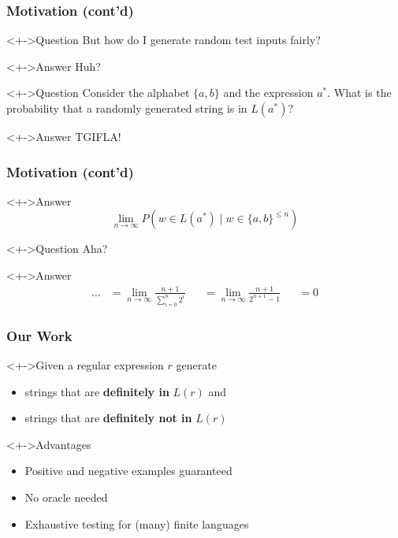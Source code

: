 \documentclass[pdftex]{beamer}
\begin{document}
\begin{frame}
  \frametitle{Motivation (cont'd)}
  \begin{block}<+->{Question}
    But how do I generate random test inputs fairly?
  \end{block}
  \begin{exampleblock}<+->{Answer}
    Huh?
  \end{exampleblock}
  \begin{block}<+->{Question}
    Consider the alphabet $\{a,b\}$ and the expression $a^*$. What is
    the probability that a randomly generated string is in $L (a^*)$?
  \end{block}
  \begin{exampleblock}<+->{Answer}
    TGIFLA!
  \end{exampleblock}
\end{frame}
\begin{frame}
  \frametitle{Motivation (cont'd)}
  \begin{exampleblock}<+->{Answer}
    \begin{displaymath}
      \lim_{n\to\infty} P (w \in L(a^*) \mid w \in \{a,b\}^{\le n})
    \end{displaymath}
  \end{exampleblock}
  \begin{block}<+->{Question}
    Aha?
  \end{block}
  \begin{exampleblock}<+->{Answer}
    \vspace{-\baselineskip}
    \begin{align*}
      \dots&= \lim_{n\to\infty} \frac{n+1}{\sum_{i=0}^n 2^i } &
      &= \lim_{n\to\infty} \frac{n+1}{ 2^{n+1} -1 }  &
      &=0
    \end{align*}
  \end{exampleblock}
\end{frame}
\begin{frame}
  \frametitle{Our Work}
  \begin{block}<+->{Given a regular expression $r$ generate}
    \begin{itemize}
    \item strings that are \textbf{definitely in} $L(r)$ and
    \item strings that are \textbf{definitely not in} $L(r)$
    \end{itemize}
  \end{block}
  \begin{block}<+->{Advantages}
    \begin{itemize}
    \item Positive and negative examples guaranteed 
    \item No oracle needed
    \item Exhaustive testing for (many) finite languages
    \end{itemize}
  \end{block}
\end{frame}
\end{document}
